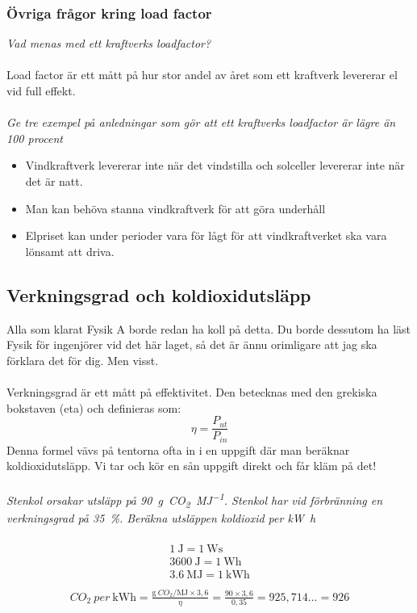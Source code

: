 \documentclass{article}
\begin{document}
\subsubsection{Övriga frågor kring load factor}
\textit{Vad menas med ett kraftverks loadfactor?}\\
\\
Load factor är ett mått på hur stor andel av året som ett kraftverk levererar el vid full effekt.\\
\\
\textit{Ge tre exempel på anledningar som gör att ett kraftverks loadfactor är lägre än 100 procent}
\begin{itemize}
    \item Vindkraftverk levererar inte när det vindstilla och solceller levererar inte när det är natt.
    \item Man kan behöva stanna vindkraftverk för att göra underhåll
    \item Elpriset kan under perioder vara för lågt för att vindkraftverket ska vara lönsamt att driva.
\end{itemize}

\subsection{Verkningsgrad och koldioxidutsläpp}
Alla som klarat Fysik A borde redan ha koll på detta. Du borde dessutom ha läst Fysik för ingenjörer vid det här laget, så det är ännu orimligare att jag ska förklara det för dig. Men visst.\\
\\
Verkningsgrad är ett mått på effektivitet. Den betecknas med den grekiska bokstaven \si{\eta} (eta) och definieras som:
\begin{equation}
\si{\eta} = \frac{P_{ut}}{P_{in}}
\end{equation}
Denna formel vävs på tentorna ofta in i en uppgift där man beräknar koldioxidutsläpp. Vi tar och kör en sån uppgift direkt och får kläm på det!\\
\\
\textit{Stenkol orsakar utsläpp på \SI{90}{\gram~CO_2\per\mega\joule}. Stenkol har vid förbränning en verkningsgrad på \SI{35}{\percent}. Beräkna utsläppen koldioxid per \si{\kilo\watt\hour}}\\
\\
\begin{equation}
\begin{aligned}
\SI{1}{\joule} = \SI{1}{\watt\second}\\
\SI{3600}{\joule} = \SI{1}{\watt\hour}\\
\SI{3,6}{\mega\joule} = \SI{1}{\kilo\watt\hour}\\
\end{aligned}
\end{equation}
\begin{equation}
\begin{aligned}
CO_2~per~\si{\kilo\watt\hour} = \frac{\si{\gram}~CO_2/\si{\mega\joule} \times 3,6}{\si{\eta}} = \frac{90 \times 3,6}{\si{0,35}} = 925,714... = 926
\end{aligned}
\end{equation}
\end{document}
